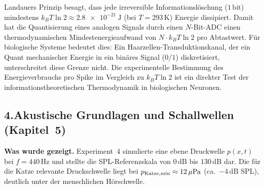 ﻿\documentclass[12pt,a4paper,titlepage]{report}
\begin{document}
\begin{itemize}[leftmargin=2em]
    Landauers Prinzip besagt, dass jede irreversible Informationslöschung
    ($1\,\mathrm{bit}$) mindestens $k_B T \ln 2 \approx
    \SI{2.8e-21}{\joule}$ (bei $T=293\,\mathrm{K}$) Energie dissipiert.
    Damit hat die Quantisierung eines analogen Signals durch einen
    $N$-Bit-ADC einen thermodynamischen Mindestenergieaufwand von
    $N \cdot k_B T \ln 2$ pro Abtastwert.
    Für biologische Systeme bedeutet dies: Ein Haarzellen-Transduktionskanal,
    der ein Quant mechanischer Energie in ein binäres Signal ($0$/$1$)
    diskretisiert, unterschreitet diese Grenze nicht.
    Die experimentelle Bestimmung des Energieverbrauchs pro Spike
    im Vergleich zu $k_B T \ln 2$ ist ein direkter Test der
    informationstheoretischen Thermodynamik in biologischen Neuronen.
\end{itemize}

\subsection*{4.\enspace Akustische Grundlagen und Schallwellen
(Kapitel~5)}

\textbf{Was wurde gezeigt.}
Experiment~4 simulierte eine ebene Druckwelle $p(x,t)$ bei $f=440\,\mathrm{Hz}$
und stellte die SPL-Referenzskala von $0\,\mathrm{dB}$ bis $130\,\mathrm{dB}$
dar.
Die für die Katze relevante Druckschwelle liegt bei
$p_{\rm Katze,min} \approx 12\,\mu\mathrm{Pa}$ (ca.\ $-4\,\mathrm{dB}$ SPL),
deutlich unter der menschlichen Hörschwelle.
\end{document}
